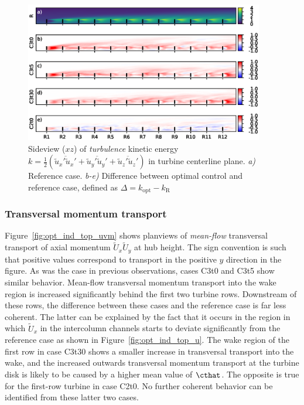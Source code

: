 		\begin{figure}[hbt]
			\centering
			\includegraphics[width=0.93\textwidth]{chapters/optimal_induction_control/sideview_tke_side.eps}
			\caption[Sideview ($xz$) of \emph{turbulence} kinetic energy $k = \frac{1}{2}(\overline{\widetilde{u}_x'\widetilde{u}_x'} + \overline{\widetilde{u}_y'\widetilde{u}_y'} + \overline{\widetilde{u}_z'\widetilde{u}_z'})$ in turbine centerline plane.]{Sideview ($xz$) of \emph{turbulence} kinetic energy $k = \frac{1}{2}(\overline{\widetilde{u}_x'\widetilde{u}_x'} + \overline{\widetilde{u}_y'\widetilde{u}_y'} + \overline{\widetilde{u}_z'\widetilde{u}_z'})$ in turbine centerline plane. \emph{a) } Reference case. \emph{b-e)} Difference between optimal control and reference case, defined as $\Delta = k_{\text{opt}} - k_{\text{R}}$  \label{fig:opt_ind_top_tke}}
		\end{figure}

	\subsubsection{Transversal momentum transport}
	
		Figure~\ref{fig:opt_ind_top_uvm} shows planviews of  \emph{mean-flow} transversal transport of axial momentum $\widetilde{U}_x \widetilde{U}_y$ at hub height. The sign convention is such that positive values correspond to transport in the positive $y$ direction in the figure. As was the case in previous observations, cases C3t0 and C3t5 show similar behavior. Mean-flow transversal momentum transport into the wake region is increased significantly behind the first two turbine rows. Downstream of these rows, the difference between these cases and the reference case is far less coherent. The latter can be explained by the fact that it occurs in the region in which $\widetilde{U}_x$ in the intercolumn channels starts to deviate significantly from the reference case as shown in Figure~\ref{fig:opt_ind_top_u}. The wake region of the first row in case C3t30 shows a smaller increase in transversal transport into the wake, and the increased outwards transversal momentum transport at the turbine disk is likely to be caused by a higher mean value of $\cthat$. The opposite is true for the first-row turbine in case C2t0. No further coherent behavior can be identified from these latter two cases.
	
